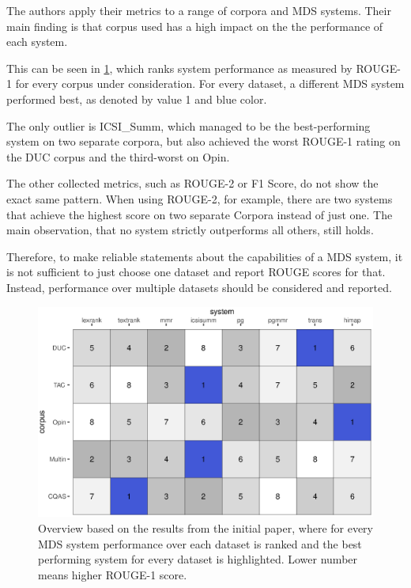 \documentclass[20_original-paper.tex]{subfiles}
\begin{document}
The authors apply their metrics to a range of corpora and MDS systems. Their main finding is that corpus used has a high impact on the the performance of each system.

This can be seen in \ref{results}, which ranks system performance as measured by ROUGE-1 for every corpus under consideration. For every dataset, a different MDS system performed best, as denoted by value 1 and blue color.

The only outlier is ICSI\_Summ, which managed to be the best-performing system on two separate corpora, but also achieved the worst ROUGE-1 rating on the DUC corpus and the third-worst on Opin.


The other collected metrics, such as ROUGE-2 or F1 Score, do not show the exact same pattern.
When using ROUGE-2, for example, there are two systems that achieve the highest score on two separate Corpora instead of just one.
The main observation, that no system strictly outperforms all others, still holds.

Therefore, to make reliable statements about the capabilities of a MDS system,
it is not sufficient to just choose one dataset and report ROUGE scores for that. Instead, performance over multiple datasets should be considered and reported.


\begin{figure}
    \includegraphics[width=\textwidth]{figures/results.eps}
    \caption{Overview based on the results from the initial paper, where for every MDS system performance over each dataset is ranked and the best performing system for every dataset is highlighted. Lower number means higher ROUGE-1 score.} \label{results}
\end{figure}
\end{document}
